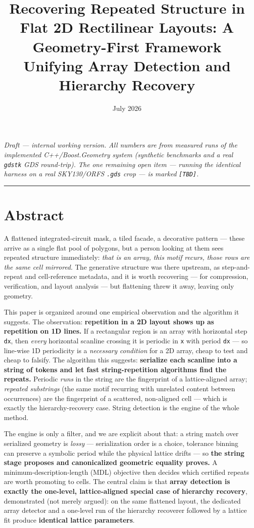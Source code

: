 \documentclass[
  11pt,
]{article}
\title{Recovering Repeated Structure in Flat 2D Rectilinear Layouts: A
Geometry-First Framework Unifying Array Detection and Hierarchy
Recovery}
\author{}
\date{July 2026}
\begin{document}
\maketitle

{
\setcounter{tocdepth}{3}
\tableofcontents
}
\emph{Draft --- internal working version. All numbers are from measured
runs of the implemented C++/Boost.Geometry system (synthetic benchmarks
and a real \texttt{gdstk} GDS round-trip). The one remaining open item
--- running the identical harness on a real SKY130/ORFS \texttt{.gds}
crop --- is marked \texttt{{[}TBD{]}}.}

\begin{center}\rule{0.5\linewidth}{0.5pt}\end{center}

\section{Abstract}\label{abstract}

A flattened integrated-circuit mask, a tiled facade, a decorative
pattern --- these arrive as a single flat pool of polygons, but a person
looking at them sees repeated structure immediately: \emph{that is an
array, this motif recurs, those rows are the same cell mirrored.} The
generative structure was there upstream, as step-and-repeat and
cell-reference metadata, and it is worth recovering --- for compression,
verification, and layout analysis --- but flattening threw it away,
leaving only geometry.

This paper is organized around one empirical observation and the
algorithm it suggests. The observation: \textbf{repetition in a 2D
layout shows up as repetition on 1D lines.} If a rectangular region is
an array with horizontal step \texttt{dx}, then \emph{every} horizontal
scanline crossing it is periodic in \texttt{x} with period \texttt{dx}
--- so line-wise 1D periodicity is a \emph{necessary condition} for a 2D
array, cheap to test and cheap to falsify. The algorithm this suggests:
\textbf{serialize each scanline into a string of tokens and let fast
string-repetition algorithms find the repeats.} Periodic \emph{runs} in
the string are the fingerprint of a lattice-aligned array;
\emph{repeated substrings} (the same motif recurring with unrelated
content between occurrences) are the fingerprint of a scattered,
non-aligned cell --- which is exactly the hierarchy-recovery case.
String detection is the engine of the whole method.

The engine is only a filter, and we are explicit about that: a string
match over serialized geometry is \emph{lossy} --- serialization order
is a choice, tolerance binning can preserve a symbolic period while the
physical lattice drifts --- so \textbf{the string stage proposes and
canonicalized geometric equality proves.} A minimum-description-length
(MDL) objective then decides which certified repeats are worth promoting
to cells. The central claim is that \textbf{array detection is exactly
the one-level, lattice-aligned special case of hierarchy recovery},
demonstrated (not merely argued): on the same flattened layout, the
dedicated array detector and a one-level run of the hierarchy recoverer
followed by a lattice fit produce \textbf{identical lattice parameters}.
\end{document}
